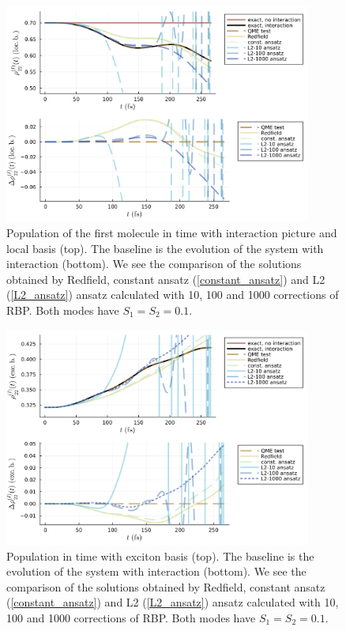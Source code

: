 \newpage
\begin{figure}[H]
\centering
\includegraphics[width=0.9\textwidth]{img/ansatz/ansatz02_I_joined_intloc22.png}
\caption{Population of the first molecule in time with interaction picture and local basis (top). The baseline is the evolution of the system with interaction (bottom). We see the comparison of the solutions obtained by Redfield, constant ansatz (\ref{constant_ansatz}) and L2 (\ref{L2_ansatz}) ansatz calculated with 10, 100 and 1000 corrections of RBP. Both modes have $S_1=S_2=0.1$. }
\label{img:ansatz02_I_joined_intloc22}
\end{figure}

\begin{figure}[H]
\centering
\includegraphics[width=0.9\textwidth]{img/ansatz/ansatz02_I_joined_schexc22.png}
\caption{Population in time with exciton basis (top). The baseline is the evolution of the system with interaction (bottom). We see the comparison of the solutions obtained by Redfield, constant ansatz (\ref{constant_ansatz}) and L2 (\ref{L2_ansatz}) ansatz calculated with 10, 100 and 1000 corrections of RBP. Both modes have $S_1=S_2=0.1$. }
\label{img:ansatz02_I_joined_schexc22}
\end{figure}

